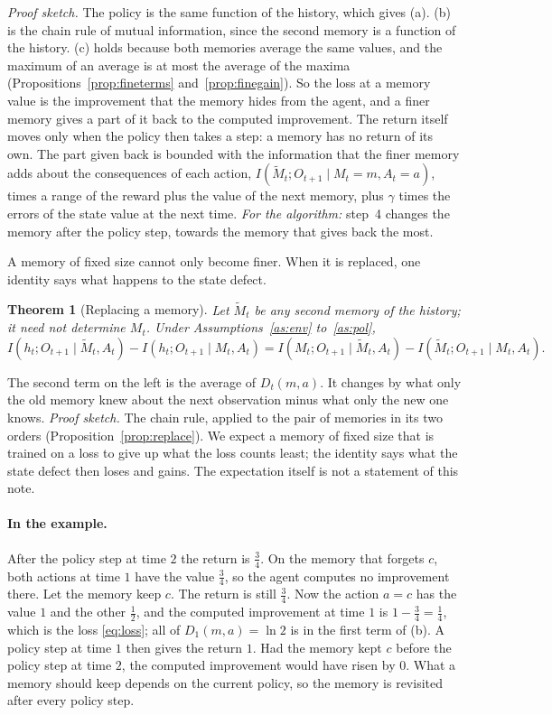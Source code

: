 \documentclass{article}
\newtheorem{theorem}{Theorem}
\newcounter{algo}
\theoremstyle{definition}
\begin{document}
\emph{Proof sketch.} The policy is the same function of the history, which gives (a). (b) is the chain rule of mutual information, since the second memory is a function of the history. (c) holds because both memories average the same values, and the maximum of an average is at most the average of the maxima (Propositions~\ref{prop:fineterms} and~\ref{prop:finegain}). So the loss at a memory value is the improvement that the memory hides from the agent, and a finer memory gives a part of it back to the computed improvement. The return itself moves only when the policy then takes a step: a memory has no return of its own. The part given back is bounded with the information that the finer memory adds about the consequences of each action, $I(\tilde M_t;O_{t+1}\mid M_t=m,A_t=a)$, times a range of the reward plus the value of the next memory, plus $\gamma$ times the errors of the state value at the next time. \emph{For the algorithm:} step~4 changes the memory after the policy step, towards the memory that gives back the most.

A memory of fixed size cannot only become finer. When it is replaced, one identity says what happens to the state defect.

\begin{theorem}[Replacing a memory]\label{thm:replace}
Let $\tilde M_t$ be any second memory of the history; it need not determine $M_t$. Under Assumptions~\ref{as:env} to~\ref{as:pol},
\[
I(h_t;O_{t+1}\mid\tilde M_t,A_t)-I(h_t;O_{t+1}\mid M_t,A_t)=I(M_t;O_{t+1}\mid\tilde M_t,A_t)-I(\tilde M_t;O_{t+1}\mid M_t,A_t).
\]
\end{theorem}

The second term on the left is the average of $D_t(m,a)$. It changes by what only the old memory knew about the next observation minus what only the new one knows. \emph{Proof sketch.} The chain rule, applied to the pair of memories in its two orders (Proposition~\ref{prop:replace}). We expect a memory of fixed size that is trained on a loss to give up what the loss counts least; the identity says what the state defect then loses and gains. The expectation itself is not a statement of this note.

\paragraph{In the example.} After the policy step at time $2$ the return is $\tfrac34$. On the memory that forgets $c$, both actions at time $1$ have the value $\tfrac34$, so the agent computes no improvement there. Let the memory keep $c$. The return is still $\tfrac34$. Now the action $a=c$ has the value $1$ and the other $\tfrac12$, and the computed improvement at time $1$ is $1-\tfrac34=\tfrac14$, which is the loss \eqref{eq:loss}; all of $D_1(m,a)=\ln2$ is in the first term of (b). A policy step at time $1$ then gives the return $1$. Had the memory kept $c$ before the policy step at time $2$, the computed improvement would have risen by $0$. What a memory should keep depends on the current policy, so the memory is revisited after every policy step.
\end{document}
